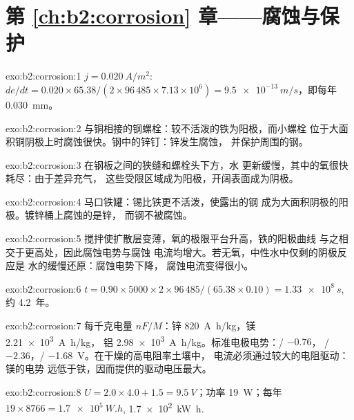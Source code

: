 \section*{第 \ref{ch:b2:corrosion} 章——腐蚀与保护}

\begin{solution}{exo:b2:corrosion:1}
$j = \qty{0.020}{A/m^2}$: $de/dt = 0.020 \times 65.38/(2 \times 96\,485 \times 7.13
\times 10^6) = \qty{9.5e-13}{m/s}$，即每年 \qty{0.030}{mm}。
\end{solution}

\begin{solution}{exo:b2:corrosion:2}
与铜相接的钢螺栓：较不活泼的铁为阳极，而小螺栓
位于大面积铜阴极上时腐蚀很快。钢中的锌钉：锌发生腐蚀，
并保护周围的钢。
\end{solution}

\begin{solution}{exo:b2:corrosion:3}
在钢板之间的狭缝和螺栓头下方，水
更新缓慢，其中的氧很快耗尽：由于差异充气，
这些受限区域成为阳极，开阔表面成为阴极。
\end{solution}

\begin{solution}{exo:b2:corrosion:4}
马口铁罐：锡比铁更不活泼，使露出的钢
成为大面积阴极的阳极。镀锌桶上腐蚀的是锌，
而钢不被腐蚀。
\end{solution}

\begin{solution}{exo:b2:corrosion:5}
搅拌使扩散层变薄，氧的极限平台升高，铁的阳极曲线
与之相交于更高处，因此腐蚀电势与腐蚀
电流均增大。若无氧，中性水中仅剩的阴极反应是
水的缓慢还原：腐蚀电势下降，
腐蚀电流变得很小。
\end{solution}

\begin{solution}{exo:b2:corrosion:6}
$t = 0.90 \times 5000 \times 2 \times 96\,485/(65.38 \times 0.10) = \qty{1.33e8}{s}$,
约 4.2~年。
\end{solution}

\begin{solution}{exo:b2:corrosion:7}
每千克电量 $nF/M$：锌 \qty{820}{A.h/kg}，镁 \qty{2.21e3}{A.h/kg}，
铝 \qty{2.98e3}{A.h/kg}。标准电极电势：/ $-0.76$，
/ $-2.36$，/ \qty{-1.68}{V}。在干燥的高电阻率土壤中，
电流必须通过较大的电阻驱动：镁的电势
远低于铁，因而提供的驱动电压最大。
\end{solution}

\begin{solution}{exo:b2:corrosion:8}
$U = 2.0 \times 4.0 + 1.5 = \qty{9.5}{V}$；功率 \qty{19}{W}；每年 $19 \times
8766 = \qty{1.7e5}{W.h}$, \qty{1.7e2}{kW.h}.
\end{solution}

